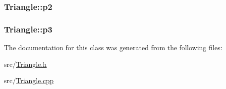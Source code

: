 \subsubsection[{\texorpdfstring{p2}{p2}}]{ Triangle\+::p2\hspace{0.3cm}{\ttfamily [private]}}\hypertarget{classTriangle_aa15acbc4f123f3e9e75e574566c2679a}{}\label{classTriangle_aa15acbc4f123f3e9e75e574566c2679a}
\subsubsection[{\texorpdfstring{p3}{p3}}]{ Triangle\+::p3\hspace{0.3cm}{\ttfamily [private]}}\hypertarget{classTriangle_a600c7366c1dad8996026742eb12434c6}{}\label{classTriangle_a600c7366c1dad8996026742eb12434c6}


The documentation for this class was generated from the following files\+:\begin{DoxyCompactItemize}
\item 
src/\hyperlink{Triangle_8h}{Triangle.\+h}\item 
src/\hyperlink{Triangle_8cpp}{Triangle.\+cpp}\end{DoxyCompactItemize}
